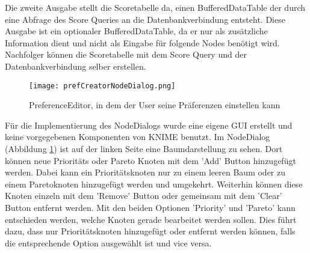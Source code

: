 Die zweite Ausgabe stellt die Scoretabelle da, einen BufferedDataTable der durch eine Abfrage des Score Queries an die Datenbankverbindung entsteht. Diese Ausgabe ist ein optionaler BufferedDataTable, da er nur als zusätzliche Information dient und nicht als Eingabe für folgende Nodes benötigt wird. Nachfolger können die Scoretabelle mit dem Score Query und der Datenbankverbindung selber erstellen.

\begin{figure}[H]
	\centering
	\texttt{[image: prefCreatorNodeDialog.png]}
	\caption{PreferenceEditor, in dem der User seine Präferenzen einstellen kann}
	\label{img:prefCreatorNodeDialog}
\end{figure}

Für die Implementierung des NodeDialogs wurde eine eigene GUI erstellt und keine vorgegebenen Komponenten von KNIME benutzt. 
Im NodeDialog (Abbildung \ref{img:prefCreatorNodeDialog}) ist auf der linken Seite eine Baumdarstellung zu sehen. Dort können neue Prioritäts oder Pareto Knoten mit dem 'Add' Button hinzugefügt werden. Dabei kann ein Prioritätsknoten nur zu einem leeren Baum oder zu einem Paretoknoten hinzugefügt werden und umgekehrt. Weiterhin können diese Knoten einzeln mit dem 'Remove' Button oder gemeinsam mit dem 'Clear' Button entfernt werden. Mit den beiden Optionen 'Priority' und 'Pareto' kann entschieden werden, welche Knoten gerade bearbeitet werden sollen. Dies führt dazu, dass nur Prioritätsknoten hinzugefügt oder entfernt werden können, falls die entsprechende Option ausgewählt ist und vice versa.

